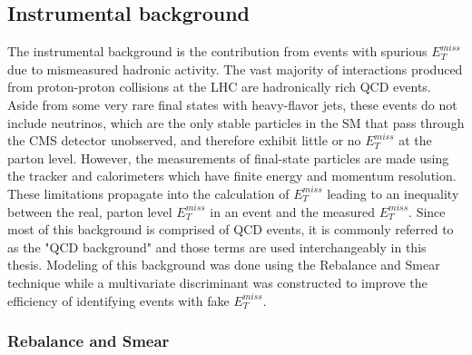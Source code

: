 \subsection{Instrumental background}
The instrumental background is the contribution from events with spurious $E^{miss}_T$ due to mismeasured hadronic activity.  The vast majority of interactions produced from proton-proton collisions at the LHC are hadronically rich QCD events.  Aside from some very rare final states with heavy-flavor jets, these events do not include neutrinos, which are the only stable particles in the SM that pass through the CMS detector unobserved, and therefore exhibit little or no $E^{miss}_T$ at the parton level.  However, the measurements of final-state particles are made using the tracker and calorimeters which have finite energy and momentum resolution.  These limitations propagate into the calculation of $E^{miss}_T$ leading to an inequality between the real, parton level $E^{miss}_T$ in an event and the measured $E^{miss}_T$.  Since most of this background is comprised of QCD events, it is commonly referred to as the "QCD background" and those terms are used interchangeably in this thesis.  Modeling of this background was done using the Rebalance and Smear technique while a multivariate discriminant was constructed to improve the efficiency of identifying events with fake $E^{miss}_T$.

\subsubsection{Rebalance and Smear}


